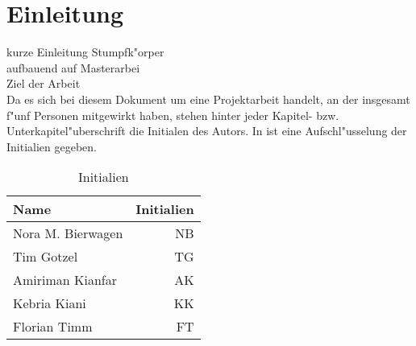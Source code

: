 \chapter{Einleitung}\label{s:einleitung}

kurze Einleitung Stumpfk"orper\\
aufbauend auf Masterarbei\\
Ziel der Arbeit\\

Da es sich bei diesem Dokument um eine Projektarbeit handelt, an der insgesamt f"unf Personen mitgewirkt haben, stehen hinter jeder Kapitel- bzw. Unterkapitel"uberschrift die Initialen des Autors. In  ist eine Aufschl"usselung der Initialien gegeben.

\begin{table}[h]
	\centering
	\begin{tabular}{lr}
		\toprule
		Name & Initialien\\
		\midrule
		Nora M. Bierwagen & NB\\
		Tim Gotzel & TG\\
		Amiriman Kianfar & AK\\
		Kebria Kiani & KK\\
		Florian Timm & FT\\
		\bottomrule
	\end{tabular}
	\caption{Initialien}
	\label{tab:initialien}
\end{table}
